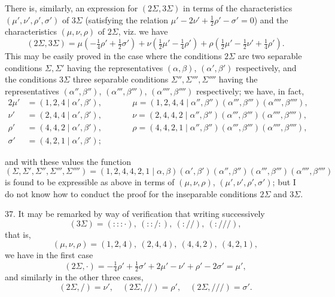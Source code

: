 \documentclass[12pt,a4paper]{article}
\begin{document}
There is, similarly, an expression for $(2\Sigma, 3\Sigma)$ in terms of the characteristics $(\mu', \nu', \rho', \sigma')$ of $3\Sigma$ (satisfying the relation $\mu' - 2\nu' + \tfrac{1}{2}\rho' - \sigma' = 0$) and the characteristics $(\mu, \nu, \rho)$ of $2\Sigma$, viz. we have
\[
(2\Sigma, 3\Sigma) = \mu(-\tfrac{1}{4}\rho' + \tfrac{1}{2}\sigma') + \nu(\tfrac{1}{2}\mu' - \tfrac{1}{4}\rho') + \rho(\tfrac{1}{2}\mu' - \tfrac{1}{2}\nu' + \tfrac{1}{4}\rho').
\]
This may be easily proved in the case where the conditions $2\Sigma$ are two separable conditions $\Sigma, \Sigma'$ having the representatives $(\alpha, \beta)$, $(\alpha', \beta')$ respectively, and the conditions $3\Sigma$ three separable conditions $\Sigma'', \Sigma''', \Sigma''''$ having the representatives $(\alpha'', \beta'')$, $(\alpha''', \beta''')$, $(\alpha'''', \beta'''')$ respectively; we have, in fact,
\begin{alignat*}{2}
\mu' &= (1, 2, 4 \mid \alpha', \beta'),\qquad &&\mu = (1, 2, 4, 4 \mid \alpha'', \beta'')(\alpha''', \beta''')(\alpha'''', \beta''''),\\
\nu' &= (2, 4, 4 \mid \alpha', \beta'), &&\nu = (2, 4, 4, 2 \mid \alpha'', \beta'')(\alpha''', \beta''')(\alpha'''', \beta''''),\\
\rho' &= (4, 4, 2 \mid \alpha', \beta'), &&\rho = (4, 4, 2, 1 \mid \alpha'', \beta'')(\alpha''', \beta''')(\alpha'''', \beta''''),\\
\sigma' &= (4, 2, 1 \mid \alpha', \beta'); &&
\end{alignat*}

and with these values the function
\[
(\Sigma, \Sigma', \Sigma'', \Sigma''', \Sigma'''') = (1, 2, 4, 4, 2, 1 \mid \alpha, \beta)(\alpha', \beta')(\alpha'', \beta'')(\alpha''', \beta''')(\alpha'''', \beta'''')
\]
is found to be expressible as above in terms of $(\mu, \nu, \rho)$, $(\mu', \nu', \rho', \sigma')$; but I do not know how to conduct the proof for the inseparable conditions $2\Sigma$ and $3\Sigma$.

37. It may be remarked by way of verification that writing successively
\[
(3\Sigma) = (:::\cdot),\ (::/:),\ (://),\ (:///),
\]
that is,
\[
(\mu, \nu, \rho) = (1, 2, 4),\ (2, 4, 4),\ (4, 4, 2),\ (4, 2, 1),
\]
we have in the first case
\[
(2\Sigma, \cdot) = -\tfrac{1}{4}\rho' + \tfrac{1}{2}\sigma' + 2\mu' - \nu' + \rho' - 2\sigma' = \mu',
\]
and similarly in the other three cases,
\[
(2\Sigma, /) = \nu',\quad (2\Sigma, //) = \rho',\quad (2\Sigma, ///) = \sigma'.
\]
\end{document}
